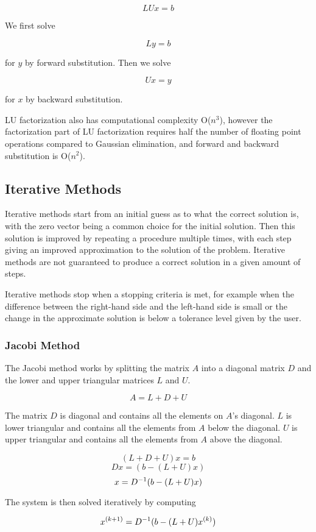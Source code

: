 $$LUx = b$$

We first solve 

$$Ly = b$$

for $y$ by forward substitution. Then we solve 

$$Ux = y$$

for $x$ by backward substitution.

LU factorization also has computational complexity O($n^3$), however the factorization part of 
LU factorization requires half the number of floating point operations compared to Gaussian elimination, 
and forward and backward substitution is O($n^2$)\cite{Kreyszig}.

\subsection{Iterative Methods}

Iterative methods start from an initial guess as to what the correct solution is, 
with the zero vector being a common choice for the initial solution. Then this 
solution is improved by repeating a procedure multiple times, with each step 
giving an improved approximation to the solution of the problem. Iterative methods 
are not guaranteed to produce a correct solution in a given amount of steps. 

Iterative methods stop when a stopping criteria is met, for example when the difference 
between the right-hand side and the left-hand side is small or the change in the approximate 
solution is below a tolerance level given by the user. 

\subsubsection{Jacobi Method}

The Jacobi method works by splitting the matrix $A$ into a diagonal matrix $D$ 
and the lower and upper triangular matrices $L$ and $U$. 

$$A = L+D+U$$

The matrix $D$ is diagonal and contains all the elements on $A$'s diagonal. $L$ 
is lower triangular and contains all the elements from $A$ below the diagonal. 
$U$ is upper triangular and contains all the elements from $A$ above the diagonal.

$$(L+D+U)x = b$$
$$Dx = (b - (L+U)x)$$
$$x = {D}^{-1}(b - (L+U)x)$$

The system is then solved iteratively by computing 

$$x^{(k+1)} = {D}^{-1}(b - (L+U)x^{(k)})$$

